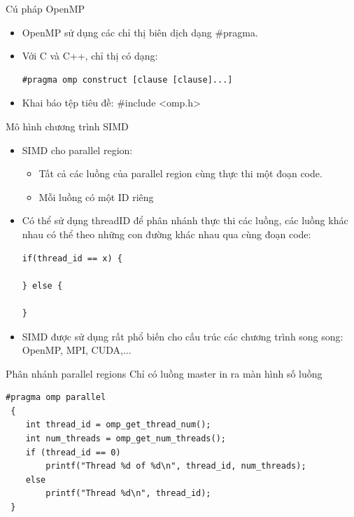 \documentclass[10pt]{beamer}
\theoremstyle{remark}
\numberwithin{algocf}{section}
\numberwithin{equation}{section}
\numberwithin{dl}{section}
\numberwithin{figure}{section}
\begin{document}
\begin{frame}[fragile]{Cú pháp OpenMP}
    \begin{itemize}
        \item OpenMP sử dụng các chỉ thị biên dịch dạng \#pragma.
        \item Với C và C++, chỉ thị có dạng:
        \begin{verbatim}
#pragma omp construct [clause [clause]...]
        \end{verbatim}
        \item Khai báo tệp tiêu đề: \#include <omp.h>
    \end{itemize}
\end{frame}

\begin{frame}{Mô hình chương trình SIMD}
    \begin{itemize}
        \item SIMD cho parallel region:
        \begin{itemize}
            \item Tất cả các luồng của parallel region cùng thực thi một đoạn code.
            \item Mỗi luồng có một ID riêng
        \end{itemize}
        \item Có thể sử dụng threadID để phân nhánh thực thi các luồng, các luồng khác nhau có thể theo những con đường khác nhau qua cùng đoạn code:
        \begin{verbatim}
if(thread_id == x) {

} else {

}
        \end{verbatim}
        \item SIMD được sử dụng rất phổ biến cho cấu trúc các chương trình song song: OpenMP, MPI, CUDA,...
    \end{itemize}
\end{frame}

\begin{frame}[fragile]{Phân nhánh parallel regions}
    Chỉ có luồng master in ra màn hình số luồng
        \begin{verbatim}
#pragma omp parallel
 {
    int thread_id = omp_get_thread_num(); 
    int num_threads = omp_get_num_threads();
    if (thread_id == 0) 
        printf("Thread %d of %d\n", thread_id, num_threads); 
    else 
        printf("Thread %d\n", thread_id);
 }
        \end{verbatim}
\end{frame}
\end{document}
